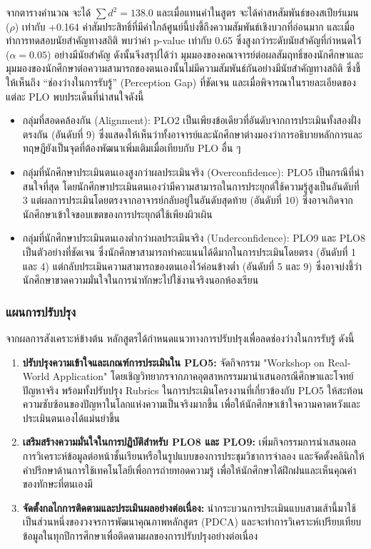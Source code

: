 จากตารางคำนวณ จะได้ $\sum d^2 = 138.0$ และเมื่อแทนค่าในสูตร จะได้ค่าสหสัมพันธ์ของสเปียร์แมน ($\rho$) เท่ากับ +0.164 ค่าสัมประสิทธิ์ที่มีค่าใกล้ศูนย์นี้บ่งชี้ถึงความสัมพันธ์เชิงบวกที่อ่อนมาก และเมื่อทำการทดสอบนัยสำคัญทางสถิติ พบว่าค่า p-value เท่ากับ 0.65 ซึ่งสูงกว่าระดับนัยสำคัญที่กำหนดไว้ ($\alpha = 0.05$) อย่างมีนัยสำคัญ 
ดังนั้นจึงสรุปได้ว่า มุมมองของคณาจารย์ต่อผลสัมฤทธิ์ของนักศึกษาและมุมมองของนักศึกษาต่อความสามารถของตนเองนั้นไม่มีความสัมพันธ์กันอย่างมีนัยสำคัญทางสถิติ ซึ่งชี้ให้เห็นถึง ``ช่องว่างในการรับรู้'' (Perception Gap) ที่ชัดเจน
และเมื่อพิจารณาในรายละเอียดของแต่ละ PLO พบประเด็นที่น่าสนใจดังนี้
\begin{itemize}
	\item กลุ่มที่สอดคล้องกัน (Alignment): PLO2 เป็นเพียงข้อเดียวที่อันดับจากการประเมินทั้งสองฝั่งตรงกัน (อันดับที่ 9) ซึ่งแสดงให้เห็นว่าทั้งอาจารย์และนักศึกษาต่างมองว่าการอธิบายหลักการและทฤษฎียังเป็นจุดที่ต้องพัฒนาเพิ่มเติมเมื่อเทียบกับ PLO อื่น ๆ
	\item กลุ่มที่นักศึกษาประเมินตนเองสูงกว่าผลประเมินจริง (Overconfidence): PLO5 เป็นกรณีที่น่าสนใจที่สุด โดยนักศึกษาประเมินตนเองว่ามีความสามารถในการประยุกต์ใช้ความรู้สูงเป็นอันดับที่ 3 แต่ผลการประเมินโดยตรงจากอาจารย์กลับอยู่ในอันดับสุดท้าย (อันดับที่ 10) ซึ่งอาจเกิดจากนักศึกษาเข้าใจขอบเขตของการประยุกต์ใช้เพียงผิวเผิน
	\item กลุ่มที่นักศึกษาประเมินตนเองต่ำกว่าผลประเมินจริง (Underconfidence): PLO9 และ PLO8 เป็นตัวอย่างที่ชัดเจน ซึ่งนักศึกษาสามารถทำคะแนนได้ดีมากในการประเมินโดยตรง (อันดับที่ 1 และ 4) แต่กลับประเมินความสามารถของตนเองไว้ค่อนข้างต่ำ (อันดับที่ 5 และ 9) ซึ่งอาจบ่งชี้ว่านักศึกษาขาดความมั่นใจในการนำทักษะไปใช้งานจริงนอกห้องเรียน
\end{itemize}

\subsubsection*{แผนการปรับปรุง}
จากผลการสังเคราะห์ข้างต้น หลักสูตรได้กำหนดแนวทางการปรับปรุงเพื่อลดช่องว่างในการรับรู้ ดังนี้
\begin{enumerate}
	\item {\bfseries ปรับปรุงความเข้าใจและเกณฑ์การประเมินใน PLO5:} จัดกิจกรรม "Workshop on Real-World Application" โดยเชิญวิทยากรจากภาคอุตสาหกรรมมานำเสนอกรณีศึกษาและโจทย์ปัญหาจริง พร้อมทั้งปรับปรุง Rubrics ในการประเมินโครงงานที่เกี่ยวข้องกับ PLO5 ให้สะท้อนความซับซ้อนของปัญหาในโลกแห่งความเป็นจริงมากขึ้น เพื่อให้นักศึกษาเข้าใจความคาดหวังและประเมินตนเองได้แม่นยำขึ้น
	\item {\bfseries เสริมสร้างความมั่นใจในการปฏิบัติสำหรับ PLO8 และ PLO9:} เพิ่มกิจกรรมการนำเสนอผลการวิเคราะห์ข้อมูลต่อหน้าชั้นเรียนหรือในรูปแบบของการประชุมวิชาการจำลอง และจัดตั้งคลินิกให้คำปรึกษาด้านการใช้เทคโนโลยีเพื่อการถ่ายทอดความรู้ เพื่อให้นักศึกษาได้ฝึกฝนและเห็นคุณค่าของทักษะที่ตนเองมี
	\item {\bfseries จัดตั้งกลไกการติดตามและประเมินผลอย่างต่อเนื่อง:} นำกระบวนการประเมินแบบสามเส้านี้มาใช้เป็นส่วนหนึ่งของวงจรการพัฒนาคุณภาพหลักสูตร (PDCA) และจะทำการวิเคราะห์เปรียบเทียบข้อมูลในทุกปีการศึกษาเพื่อติดตามผลของการปรับปรุงอย่างต่อเนื่อง
\end{enumerate}

